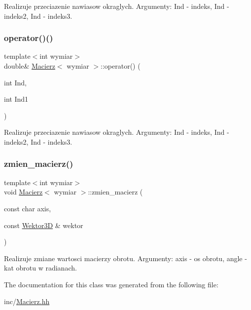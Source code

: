 Realizuje przeciazenie nawiasow okraglych. Argumenty\+: Ind -\/ indeks, Ind -\/ indeks2, Ind -\/ indeks3. \mbox{\label{class_macierz_a62fdb2bc9eeb1a119a89348e8954ca5e}} 
\subsubsection{\texorpdfstring{operator()()}{operator()()}\hspace{0.1cm}{\footnotesize\ttfamily [2/2]}}
{\footnotesize\ttfamily template$<$int wymiar$>$ \\
double\& \mbox{\hyperlink{class_macierz}{Macierz}}$<$ wymiar $>$\+::operator() (\begin{DoxyParamCaption}\item[{int}]{Ind,  }\item[{int}]{Ind1 }\end{DoxyParamCaption})\hspace{0.3cm}{\ttfamily [inline]}}

Realizuje przeciazenie nawiasow okraglych. Argumenty\+: Ind -\/ indeks, Ind -\/ indeks2, Ind -\/ indeks3. \mbox{\label{class_macierz_ad07d660e3cb6f1fef0eed03ddc73123b}} 
\subsubsection{\texorpdfstring{zmien\_macierz()}{zmien\_macierz()}}
{\footnotesize\ttfamily template$<$int wymiar$>$ \\
void \mbox{\hyperlink{class_macierz}{Macierz}}$<$ wymiar $>$\+::zmien\+\_\+macierz (\begin{DoxyParamCaption}\item[{const char}]{axis,  }\item[{const \mbox{\hyperlink{class_wektor}{Wektor3D}} \&}]{wektor }\end{DoxyParamCaption})}

Realizuje zmiane wartosci macierzy obrotu. Argumenty\+: axis -\/ os obrotu, angle -\/ kat obrotu w radianach. 

The documentation for this class was generated from the following file\+:\begin{DoxyCompactItemize}
\item 
inc/\mbox{\hyperlink{_macierz_8hh}{Macierz.\+hh}}\end{DoxyCompactItemize}
